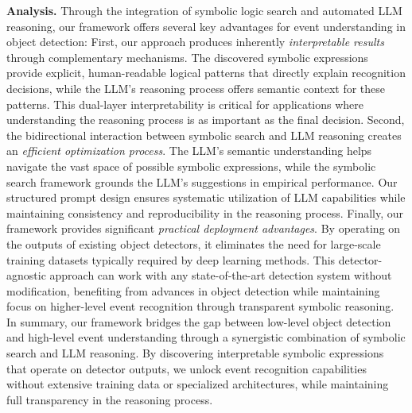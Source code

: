 \noindent
\textbf{Analysis.} Through the integration of symbolic logic search and automated LLM reasoning, our framework offers several key advantages for event understanding in object detection: 
First, our approach produces inherently \textit{interpretable results} through complementary mechanisms. The discovered symbolic expressions provide explicit, human-readable logical patterns that directly explain recognition decisions, while the LLM's reasoning process offers semantic context for these patterns. This dual-layer interpretability is critical for applications where understanding the reasoning process is as important as the final decision. 
Second, the bidirectional interaction between symbolic search and LLM reasoning creates an \textit{efficient optimization process}. The LLM's semantic understanding helps navigate the vast space of possible symbolic expressions, while the symbolic search framework grounds the LLM's suggestions in empirical performance. Our structured prompt design ensures systematic utilization of LLM capabilities while maintaining consistency and reproducibility in the reasoning process.
Finally, our framework provides significant \textit{practical deployment advantages}. By operating on the outputs of existing object detectors, it eliminates the need for large-scale training datasets typically required by deep learning methods. This detector-agnostic approach can work with any state-of-the-art detection system without modification, benefiting from advances in object detection while maintaining focus on higher-level event recognition through transparent symbolic reasoning.
\noindent In summary, our framework bridges the gap between low-level object detection and high-level event understanding through a synergistic combination of symbolic search and LLM reasoning. By discovering interpretable symbolic expressions that operate on detector outputs, we unlock event recognition capabilities without extensive training data or specialized architectures, while maintaining full transparency in the reasoning process.